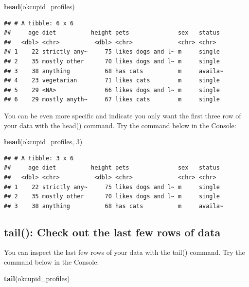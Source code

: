 \documentclass[
]{krantz}
\makeatletter
\newenvironment{Shaded}{\begin{snugshade}}{\end{snugshade}}
\newcommand{\DecValTok}[1]{\textcolor[rgb]{0.06,0.06,0.06}{#1}}
\newcommand{\KeywordTok}[1]{\textcolor[rgb]{0.27,0.27,0.27}{\textbf{#1}}}
\newcommand{\NormalTok}[1]{#1}
\newenvironment{kframe}{%
\medskip{}
\setlength{\fboxsep}{.8em}
 \def\at@end@of@kframe{}%
 \ifinner\ifhmode%
  \def\at@end@of@kframe{\end{minipage}}%
  \begin{minipage}{\columnwidth}%
 \fi\fi%
 \def\FrameCommand##1{\hskip\@totalleftmargin \hskip-\fboxsep
 \colorbox{shadecolor}{##1}\hskip-\fboxsep
     \hskip-\linewidth \hskip-\@totalleftmargin \hskip\columnwidth}%
 \MakeFramed {\advance\hsize-\width
   \@totalleftmargin\z@ \linewidth\hsize
   \@setminipage}}%
 {\par\unskip\endMakeFramed%
 \at@end@of@kframe}
\renewenvironment{Shaded}{\begin{kframe}}{\end{kframe}}
\makeatother
\begin{document}
\begin{Shaded}
\begin{Highlighting}[]
\KeywordTok{head}\NormalTok{(okcupid_profiles)}
\end{Highlighting}
\end{Shaded}

\begin{verbatim}
## # A tibble: 6 x 6
##     age diet          height pets              sex   status 
##   <dbl> <chr>          <dbl> <chr>             <chr> <chr>  
## 1    22 strictly any~     75 likes dogs and l~ m     single 
## 2    35 mostly other      70 likes dogs and l~ m     single 
## 3    38 anything          68 has cats          m     availa~
## 4    23 vegetarian        71 likes cats        m     single 
## 5    29 <NA>              66 likes dogs and l~ m     single 
## 6    29 mostly anyth~     67 likes cats        m     single
\end{verbatim}

You can be even more specific and indicate you only want the first three row of your data with the head() command. Try the command below in the Console:

\begin{Shaded}
\begin{Highlighting}[]
\KeywordTok{head}\NormalTok{(okcupid_profiles, }\DecValTok{3}\NormalTok{)}
\end{Highlighting}
\end{Shaded}

\begin{verbatim}
## # A tibble: 3 x 6
##     age diet          height pets              sex   status 
##   <dbl> <chr>          <dbl> <chr>             <chr> <chr>  
## 1    22 strictly any~     75 likes dogs and l~ m     single 
## 2    35 mostly other      70 likes dogs and l~ m     single 
## 3    38 anything          68 has cats          m     availa~
\end{verbatim}

\hypertarget{tail-check-out-the-last-few-rows-of-data}{%
\subsection{tail(): Check out the last few rows of data}\label{tail-check-out-the-last-few-rows-of-data}}

You can inspect the last few rows of your data with the tail() command. Try the command below in the Console:

\begin{Shaded}
\begin{Highlighting}[]
\KeywordTok{tail}\NormalTok{(okcupid_profiles)}
\end{Highlighting}
\end{Shaded}
\end{document}
